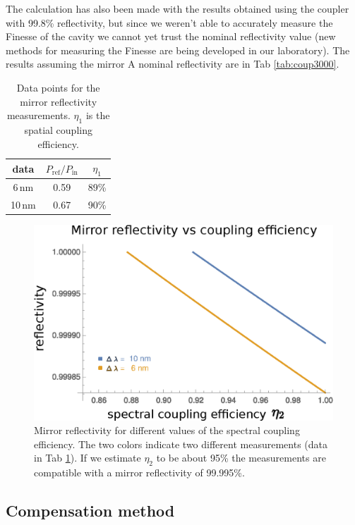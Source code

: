 The calculation has also been made with the results obtained using the coupler with 99.8\% reflectivity, but since we weren't able to accurately measure the Finesse of the cavity we cannot yet trust the nominal reflectivity value (new methods for measuring the Finesse are being developed in our laboratory). The results assuming the mirror A nominal reflectivity are in Tab \ref{tab:coup3000}.
\begin{table}
	\centering
	\begin{tabular}{|c|c|c|}
		\hline 
		data  &$P_\mathrm{ref}/P_\mathrm{in}$ &$\eta_1$ \\ 
		\hline 
		6\,nm	& 0.59 & 89\% \\ 
		\hline 
		10\,nm	& 0.67 & 90\% \\ 
		\hline 
		
	\end{tabular}
	\caption{Data points for the mirror reflectivity measurements. $\eta_1$ is the spatial coupling efficiency.}
	\label{tab:ref}
\end{table}

\begin{figure}
	\centering
	\includegraphics[width=0.9\linewidth]{images/reflectivities.eps}
	\caption{Mirror reflectivity for different values of the spectral coupling efficiency. The two colors indicate two different measurements (data in Tab \ref{tab:ref}). If we estimate $\eta_2$ to be about 95\% the measurements are compatible with a mirror reflectivity of 99.995\%.}
	\label{fig:reflectivities}
\end{figure}

\subsection{Compensation method}

